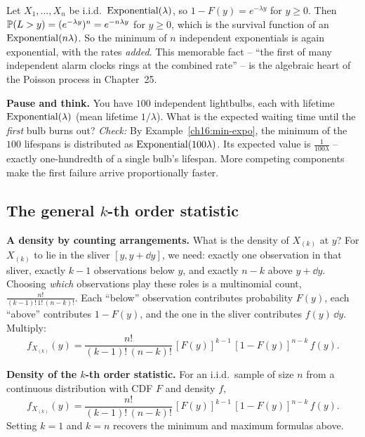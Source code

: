 \begin{example}
\label{ch16:min-expo}
Let $X_1,\dots,X_n$ be i.i.d.\ $\Expo(\lambda)$, so $1-F(y)=e^{-\lambda y}$ for $y \ge 0$. Then
$\P(L>y) = (e^{-\lambda y})^n = e^{-n\lambda y}$ for $y \ge 0$, which is the survival function of an
$\Expo(n\lambda)$. So the minimum of $n$ independent exponentials is again exponential,
with the rates \emph{added}. This memorable fact -- ``the first of many independent alarm
clocks rings at the combined rate'' -- is the algebraic heart of the Poisson process in
Chapter~25.
\end{example}

\begin{recoverybox}
\textbf{Pause and think.} You have $100$ independent lightbulbs, each with lifetime
$\Expo(\lambda)$ (mean lifetime $1/\lambda$). What is the expected waiting time until the
\emph{first} bulb burns out?
\emph{Check:} By Example~\ref{ch16:min-expo}, the minimum of the $100$ lifespans is distributed
as $\Expo(100\lambda)$. Its expected value is $\frac{1}{100\lambda}$ -- exactly one-hundredth
of a single bulb's lifespan. More competing components make the first failure arrive
proportionally faster.
\end{recoverybox}

\subsection{The general $k$-th order statistic}

\begin{whybox}
\textbf{A density by counting arrangements.} What is the density of $X_{(k)}$ at $y$? For
$X_{(k)}$ to lie in the sliver $[y,y+\dd y]$, we need: exactly one observation in that
sliver, exactly $k-1$ observations below $y$, and exactly $n-k$ above $y+\dd y$. Choosing
\emph{which} observations play these roles is a multinomial count,
$\tfrac{n!}{(k-1)!\,1!\,(n-k)!}$. Each ``below'' observation
contributes probability $F(y)$, each ``above'' contributes $1-F(y)$, and the one in the
sliver contributes $f(y)\,\dd y$. Multiply:
\[
  f_{X_{(k)}}(y) = \frac{n!}{(k-1)!\,(n-k)!}\,[F(y)]^{k-1}\,[1-F(y)]^{n-k}\,f(y).
\]
\end{whybox}

\begin{formalbox}
\textbf{Density of the $k$-th order statistic.} For an i.i.d.\ sample of size $n$ from a
continuous distribution with CDF $F$ and density $f$,
\[
  f_{X_{(k)}}(y) = \frac{n!}{(k-1)!\,(n-k)!}\,[F(y)]^{k-1}\,[1-F(y)]^{n-k}\,f(y).
\]
Setting $k=1$ and $k=n$ recovers the minimum and maximum formulas above.
\end{formalbox}


